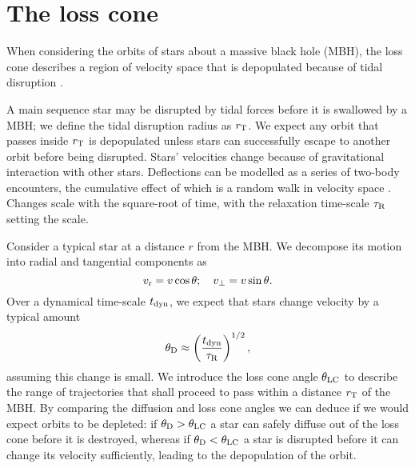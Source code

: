 \chapter{The loss cone}

When considering the orbits of stars about a massive black hole (MBH), the loss cone describes a region of velocity space that is depopulated because of tidal disruption \citep{Frank1976,Lightman1977}.

A main sequence star may be disrupted by tidal forces before it is swallowed by a MBH; we define the tidal disruption radius as $r_\mathrm{T}$. We expect any orbit that passes inside $r_\mathrm{T}$ is depopulated unless stars can successfully escape to another orbit before being disrupted. Stars' velocities change because of gravitational interaction with other stars. Deflections can be modelled as a series of two-body encounters, the cumulative effect of which is a random walk in velocity space \citep[chapter 2]{Chandrasekhar1960}. Changes scale with the square-root of time, with the relaxation time-scale $\tau_\mathrm{R}$ setting the scale.

Consider a typical star at a distance $r$ from the MBH. We decompose its motion into radial and tangential components as
\begin{equation}
v_\mathrm{r} = v\cos \theta; \quad v_\perp = v\sin \theta.
\end{equation}
Over a dynamical time-scale $t_\mathrm{dyn}$, we expect that stars change velocity by a typical amount
\begin{equation}
\theta_\mathrm{D} \approx \left(\frac{t_\mathrm{dyn}}{\tau_\mathrm{R}}\right)^{1/2},
\end{equation}
assuming this change is small. We introduce the loss cone angle $\theta_\mathrm{LC}$ to describe the range of trajectories that shall proceed to pass within a distance $r_\mathrm{T}$ of the MBH. By comparing the diffusion and loss cone angles we can deduce if we would expect orbits to be depleted: if $\theta_\mathrm{D} > \theta_\mathrm{LC}$ a star can safely diffuse out of the loss cone before it is destroyed, whereas if $\theta_\mathrm{D} < \theta_\mathrm{LC}$ a star is disrupted before it can change its velocity sufficiently, leading to the depopulation of the orbit.

